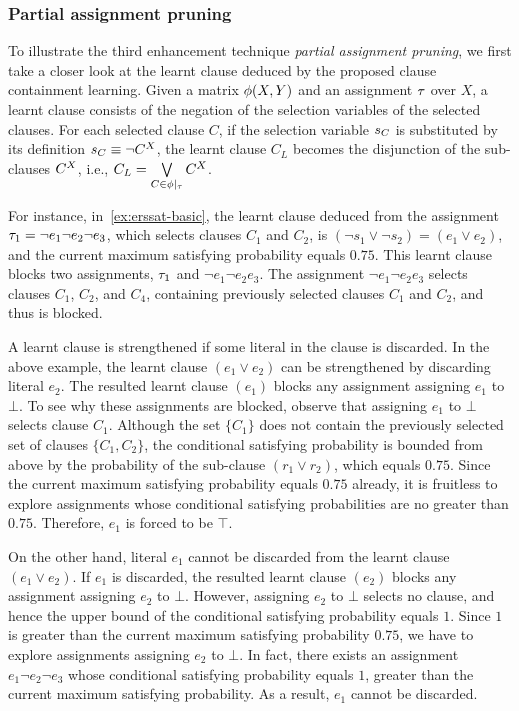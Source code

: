 \subsubsection{Partial assignment pruning}
To illustrate the third enhancement technique \textit{partial assignment pruning},
we first take a closer look at the learnt clause deduced by the proposed clause containment learning.
Given a matrix $\phi(X,Y)$ and an assignment $\tau$ over $X$,
a learnt clause consists of the negation of the selection variables of the selected clauses.
For each selected clause $C$,
if the selection variable $s_{C}$ is substituted by its definition $s_{C}\equiv\lnot C^X$,
the learnt clause $C_L$ becomes the disjunction of the sub-clauses $C^X$,
i.e., $C_L=\bigvee\limits_{C\in\phi|_{\tau}}C^X$.

For instance, in~\cref{ex:erssat-basic},
the learnt clause deduced from the assignment $\tau_1=\lnot e_1 \lnot e_2 \lnot e_3$,
which selects clauses $C_1$ and $C_2$,
is $(\lnot s_1 \lor \lnot s_2)=(e_1 \lor e_2)$,
and the current maximum satisfying probability equals $0.75$.
This learnt clause blocks two assignments, $\tau_1$ and $\lnot e_1 \lnot e_2 e_3$.
The assignment $\lnot e_1 \lnot e_2 e_3$ selects clauses $C_1$, $C_2$, and $C_4$,
containing previously selected clauses $C_1$ and $C_2$, and thus is blocked.

A learnt clause is strengthened if some literal in the clause is discarded.
In the above example,
the learnt clause $(e_1 \lor e_2)$ can be strengthened by discarding literal $e_2$.
The resulted learnt clause $(e_1)$ blocks any assignment assigning $e_1$ to $\bot$.
To see why these assignments are blocked,
observe that assigning $e_1$ to $\bot$ selects clause $C_1$.
Although the set $\{C_1\}$ does not contain the previously selected set of clauses $\{C_1,C_2\}$,
the conditional satisfying probability is bounded from above by the probability of the sub-clause $(r_1 \lor r_2)$,
which equals $0.75$.
Since the current maximum satisfying probability equals $0.75$ already,
it is fruitless to explore assignments whose conditional satisfying probabilities are no greater than $0.75$. Therefore, $e_1$ is forced to be $\top$.

On the other hand,
literal $e_1$ cannot be discarded from the learnt clause $(e_1 \lor e_2)$.
If $e_1$ is discarded,
the resulted learnt clause $(e_2)$ blocks any assignment assigning $e_2$ to $\bot$.
However, assigning $e_2$ to $\bot$ selects no clause,
and hence the upper bound of the conditional satisfying probability equals $1$.
Since $1$ is greater than the current maximum satisfying probability $0.75$,
we have to explore assignments assigning $e_2$ to $\bot$.
In fact, there exists an assignment $e_1 \lnot e_2 \lnot e_3$ whose conditional satisfying probability equals $1$,
greater than the current maximum satisfying probability.
As a result, $e_1$ cannot be discarded.

